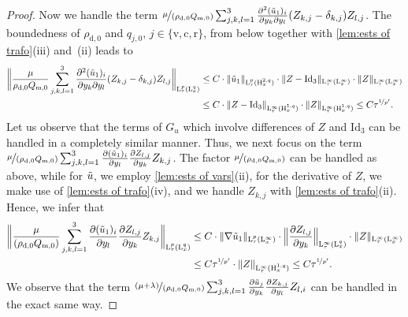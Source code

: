 \documentclass[10pt]{amsart}
\theoremstyle{plain}
\theoremstyle{definition}
\theoremstyle{thm}
\numberwithin{equation}{section}
\newcommand{\rL}{\mathrm{L}}
\newcommand{\rH}{\mathrm{H}}
\newcommand{\del}{\partial}
\newcommand{\rd}{\mathrm{d}}
\renewcommand{\rm}{\mathrm{m}}
\newcommand{\rr}{\mathrm{r}}
\newcommand{\rv}{\mathrm{v}}
\newcommand{\rc}{\mathrm{c}}
\newcommand{\tu}{\Tilde{u}}
\begin{document}
\begin{proof}
Now we handle the term $\nicefrac{\mu}{(\rho_{\rd,0}Q_{\rm,0})}\sum_{j,k,l=1}^3\frac{\partial^{2}(\tu_1)_i}{\partial{y_{k}}\partial{y_{l}}}(Z_{k,j}-\delta_{k,j})Z_{l,j}$.
The boundedness of $\rho_{\rd,0}$ and $q_{j,0}$, $j \in \{\rv,\rc,\rr\}$, from below together with \autoref{lem:ests of trafo}(iii) and~(ii) leads to
\begin{equation*}
    \begin{aligned}
        \biggl\| \frac{\mu}{\rho_{\rd,0}Q_{\rm,0}}\sum_{j,k,l=1}^3\frac{\partial^{2}(\tu_1)_i}{\partial{y_{k}}\partial{y_{l}}}(Z_{k,j}-\delta_{k,j})Z_{l,j} \biggr\|_{\rL_\tau^p(\rL_x^q)}
        &\le C \cdot \| \tu_1 \|_{\rL_\tau^p(\rH_x^{2,q})} \cdot \| Z - \mathrm{Id}_3 \|_{\rL_\tau^\infty(\rL_x^\infty)} \cdot \| Z \|_{\rL_\tau^\infty(\rL_x^\infty)}\\
        &\le C \cdot \| Z - \mathrm{Id}_3 \|_{\rL_\tau^\infty(\rH_x^{1,q})} \cdot \| Z \|_{\rL_\tau^\infty(\rH_x^{1,q})} \le C \tau^{\nicefrac{1}{p'}}.
    \end{aligned}
\end{equation*}
Let us observe that the terms of $G_u$ which involve differences of $Z$ and $\mathrm{Id}_3$ can be handled in a completely similar manner.
Thus, we next focus on the term~$\nicefrac{\mu}{(\rho_{\rd,0}Q_{\rm,0})} \sum_{j,k,l=1}^3\frac{\partial(\tu_1)_{i}}{\partial{y_{l}}} \frac{\partial Z_{l,j}}{\partial{y_{k}}}Z_{k,j}$.
The factor $\nicefrac{\mu}{(\rho_{\rd,0}Q_{\rm,0})}$ can be handled as above, while for $\tu$, we employ \autoref{lem:ests of vars}(ii), for the derivative of $Z$, we make use of \autoref{lem:ests of trafo}(iv), and we handle $Z_{k,j}$ with \autoref{lem:ests of trafo}(ii).
Hence, we infer that
\begin{equation*}
    \begin{aligned}
        \biggl\| \frac{\mu}{(\rho_{\rd,0}Q_{\rm,0})} \sum_{j,k,l=1}^3\frac{\partial(\tu_1)_{i}}{\partial{y_{l}}} \frac{\partial Z_{l,j}}{\partial{y_{k}}}Z_{k,j} \biggr\|_{\rL_\tau^p(\rL_x^q)}
        &\le C \cdot \| \nabla \tu_1 \|_{\rL_\tau^p(\rL_x^\infty)} \cdot \Bigl\| \frac{\del Z_{l,j}}{\del y_k} \Bigr\|_{\rL_\tau^\infty(\rL_x^q)} \cdot \| Z \|_{\rL_\tau^\infty(\rL_x^\infty)}\\
        &\le C \tau^{\nicefrac{1}{p'}} \cdot \| Z \|_{\rL_\tau^\infty(\rH_x^{1,q})} \le C \tau^{\nicefrac{1}{p'}}.
    \end{aligned}
\end{equation*}
We observe that the term $\nicefrac{(\mu+\lambda)}{(\rho_{\rd,0}Q_{\rm,0})}\sum_{j,k,l=1}^3\frac{\partial\tu_{j}}{\partial{y_{k}}} \frac{\partial Z_{k,j}}{\partial{y_{l}}}Z_{l,i}$ can be handled in the exact same way.


\end{proof}
\end{document}
